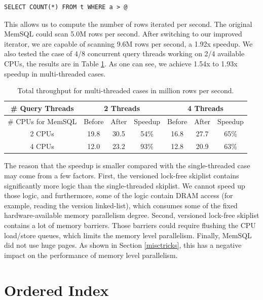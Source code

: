 \documentclass[11pt, usletter]{article}
\begin{document}
\singlespacing\begin{codebox}
\begin{verbatim}
SELECT COUNT(*) FROM t WHERE a > @
\end{verbatim}
\end{codebox}\doublespacing

This allows us to compute the number of rows iterated per second. 
The original MemSQL could scan 5.0M rows per second. 
After switching to our improved iterator, we are capable of scanning 9.6M rows per second, a 1.92x speedup. 
We also tested the case of 4/8 concurrent query threads working on 2/4 available CPUs, 
the results are in Table \ref{sliter_memsql_mt}. As one can see, we achieve 1.54x to 1.93x speedup in multi-threaded cases.
 
 \begin{table}[!htb]
 \centering
\begin{tabular}{|c|c|c|c|c|c|c|}
\hline
\# Query Threads & \multicolumn{3}{c|}{2 Threads}              & \multicolumn{3}{c|}{4 Threads}              \\ \hline
\# CPUs for MemSQL       & Before      & After       & Speedup & Before      & After       & Speedup \\ \hline
2 CPUs & 19.8 & 30.5 & 54\%    & 16.8 & 27.7 & 65\%    \\ \hline
4 CPUs & 12.0 & 23.2 & 93\%    & 12.8 & 20.9 & 63\%    \\ \hline
\end{tabular}
\caption{Total throughput for multi-threaded cases in million rows per second.}
\label{sliter_memsql_mt}
\end{table}

The reason that the speedup is smaller compared with the single-threaded case may come from a few factors. 
First, the versioned lock-free skiplist contains significantly more logic than the single-threaded skiplist. 
We cannot speed up those logic, and furthermore, some of the logic contain DRAM access (for example, 
reading the version linked-list), which consumes some of the fixed hardware-available memory parallelism degree. 
Second, versioned lock-free skiplist contains a lot of memory barriers. 
Those barriers could require flushing the CPU load/store queues, which limits the memory level parallelism. 
Finally, MemSQL did not use huge pages. 
As shown in Section \ref{misctricks}, this has a negative impact on the performance of memory level parallelism.

\section{Ordered Index} \label{orderedindex}
\end{document}
